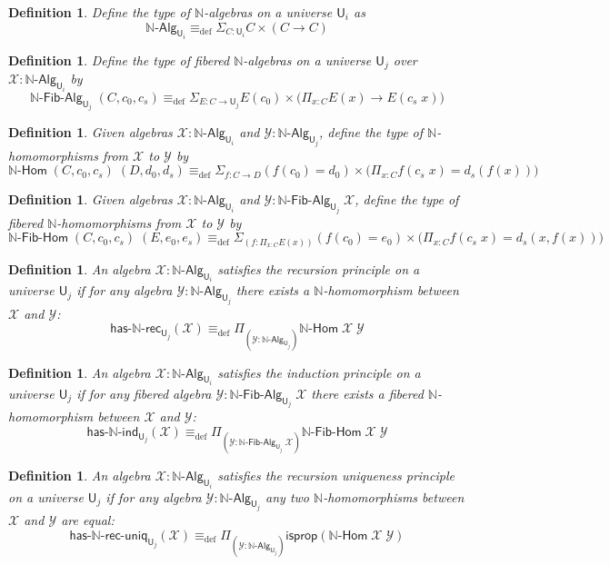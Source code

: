 \documentclass[reqno,10pt,a4paper,oneside]{amsart}
\numberwithin{equation}{section}
\theoremstyle{mythm}
\theoremstyle{mydef}
\newtheorem{definition}[theorem]{Definition}
\theoremstyle{myrmk}
\newcommand{\deq}{\equiv}
\newcommand{\defeq}{\deq_{\mathrm{def}}}
\newcommand{\isprop}{\mathsf{isprop}}
\newcommand{\prd}[1]{\Pi_{#1}}
\newcommand{\sm}[1]{\Sigma_{#1}}
\newcommand{\nat}{\ensuremath{\mathbb{N}}}
\newcommand{\UU}{\mathsf{U}}
\newcommand{\NatAlg}{\nat\text{-}\mathsf{Alg}}
\newcommand{\NatHom}{\nat\text{-}\mathsf{Hom}}
\newcommand{\HasNatRec}{\mathsf{has}\text{-}\nat\text{-}\mathsf{rec}}
\newcommand{\HasNatInd}{\mathsf{has}\text{-}\nat\text{-}\mathsf{ind}}
\newcommand{\HasNatRecUniq}{\mathsf{has}\text{-}\nat\text{-}\mathsf{rec}\text{-}\mathsf{uniq}}
\newcommand{\NatFibAlg}{\nat\text{-}\mathsf{Fib}\text{-}\mathsf{Alg}}
\newcommand{\NatFibHom}{\nat\text{-}\mathsf{Fib}\text{-}\mathsf{Hom}}
\newcommand{\X}{\mathcal{X}}
\newcommand{\Y}{\mathcal{Y}}
\begin{document}
\begin{definition}\label{def:NatAlg}
Define the type of \emph{$\nat$-algebras} on a universe $\UU_i$ as 
\[\NatAlg_{\UU_i} \defeq \sm{C : \UU_i} C \times (C \to C) \]
\end{definition}

\begin{definition}\label{def:NatFibAlg}
Define the type of \emph{fibered $\nat$-algebras} on a universe $\UU_j$ over $\mathcal{X} : \NatAlg_{\UU_i}$ by
\[\NatFibAlg_{\UU_j} \; (C,c_0,c_s) \defeq \sm{E : C \to \UU_j} E(c_0) \times \big(\prd{x:C} E(x) \to E(c_s \; x)\big) \]
\end{definition}

\begin{definition}\label{def:NatHom}
Given algebras $\X : \NatAlg_{\UU_i}$ and $\Y : \NatAlg_{\UU_j}$, define the type of \emph{$\nat$-homomorphisms} from $\X$ to $\Y$ by 
\[\NatHom \; (C,c_0,c_s) \; (D,d_0,d_s) \defeq \sm{f:C \to D} (f(c_0) = d_0) \times \big(\prd{x:C} f(c_s\;x) = d_s(f(x))\big) \]
\end{definition}

\begin{definition}\label{def:NatFibHom}
Given algebras $\X : \NatAlg_{\UU_i}$ and $\Y : \NatFibAlg_{\UU_j} \; \X$, define the type of \emph{fibered $\nat$-homomorphisms} from $\X$ to $\Y$ by
\[\NatFibHom \; (C,c_0,c_s) \; (E,e_0,e_s) \defeq \sm{(f:\prd{x:C} E(x))} (f(c_0) = e_0) \times \big(\prd{x:C} f(c_s\;x) = d_s(x,f(x))\big) \]
\end{definition}

\begin{definition}\label{def:NatRec}
An algebra $\X : \NatAlg_{\UU_i}$ \emph{satisfies the recursion principle} on a universe $\UU_j$ if for any 
algebra $\Y : \NatAlg_{\UU_j}$ there exists a $\nat$-homomorphism between $\X$ and $\Y$:
\[\HasNatRec_{\UU_j}(\X) \defeq \prd{(\Y:\NatAlg_{\UU_j})} \NatHom \; \X \; \Y\] 
\end{definition}

\begin{definition}\label{def:NatInd}
An algebra $\mathcal{X} : \NatAlg_{\UU_i}$ \emph{satisfies the induction principle} on a universe $\UU_j$ if for any 
fibered algebra $\Y : \NatFibAlg_{\UU_j} \; \X$ there exists a fibered $\nat$-homomorphism between $\X$ and $\Y$:
\[\HasNatInd_{\UU_j}(\X) \defeq \prd{(\Y:\NatFibAlg_{\UU_j} \; \X)} \NatFibHom \; \X \; \Y\] 
\end{definition}

\begin{definition}\label{def:NatRecUniq}
An algebra $\X : \NatAlg_{\UU_i}$ satisfies the \emph{recursion uniqueness principle} on a universe $\UU_j$ if for any algebra $\Y : \NatAlg_{\UU_j}$ any two $\nat$-homomorphisms between $\X$ and $\Y$ are equal:
\[ \HasNatRecUniq_{\UU_j}(\X) \defeq \prd{(\Y:\NatAlg_{\UU_j})} \isprop(\NatHom \; \X \; \Y)\]
\end{definition}
\end{document}

